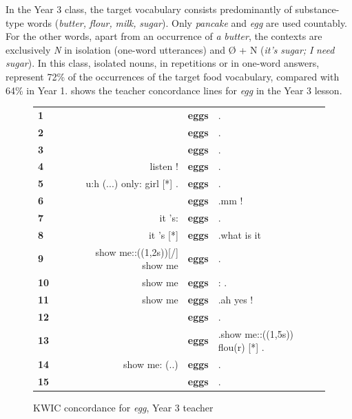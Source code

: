 \documentclass[output=paper,colorlinks,citecolor=brown,modfonts,nonflat]{../langscibook}
\begin{document}
In the Year 3 class, the target vocabulary consists predominantly of substance-type words (\textit{butter,} \textit{flour,} \textit{milk,} \textit{sugar}). Only \textit{pancake} and \textit{egg} are used countably. For the other words, apart from an occurrence of \textit{a} \textit{butter}, the contexts are exclusively \textit{N} in isolation (one-word utterances) and Ø + N (\textit{it’s} \textit{sugar;} \textit{I} \textit{need} \textit{sugar}). In this class, isolated nouns, in repetitions or in one-word answers, represent 72\% of the occurrences of the target food vocabulary, compared with 64\% in Year 1.  shows the teacher concordance lines for \textit{egg} in the Year 3 lesson.

\begin{figure}
\caption{\label{tabfig:hilton:9}KWIC concordance for  {\textit{egg}},  {Year}  {3}  {teacher}}
\ttfamily\footnotesize
\begin{tabular}{l@{}l@{}lr@{~}l@{~}l}
\lsptoprule
 \textbf{1} &   &  &  & \textbf{eggs} & .\\
 \textbf{2} &   &  &  & \textbf{eggs} & .\\
 \textbf{3} &   &  &  & \textbf{eggs} & .\\
 \textbf{4} &   &  &  listen ! & \textbf{eggs} & .\\
 \textbf{5} &   &  &  u:h (...) only: girl [*] . & \textbf{eggs} & .\\
 \textbf{6} &   &  &  & \textbf{eggs} & .mm !\\
 \textbf{7} &   &  &  it 's: & \textbf{eggs} & .\\
 \textbf{8} &   &  &  it 's [*] & \textbf{eggs} & .what is it\\
 \textbf{9} &   &  &  show me::((1,2s))[/] show me &  \textbf{eggs} & .\\
 \textbf{10} &  &  &  show me & \textbf{eggs} & : .\\
 \textbf{11} &  &  &  show me & \textbf{eggs} & .ah yes !\\
 \textbf{12} &  &  &  & \textbf{eggs} & .\\
 \textbf{13} &  &  &  & \textbf{eggs} & .show me::((1,5s)) flou(r) [*] .\\
 \textbf{14} &  &  &  show me: (..) & \textbf{eggs} & .\\
 \textbf{15} &  &  &  & \textbf{eggs} & .\\

\end{tabular}
\end{figure}
\end{document}
